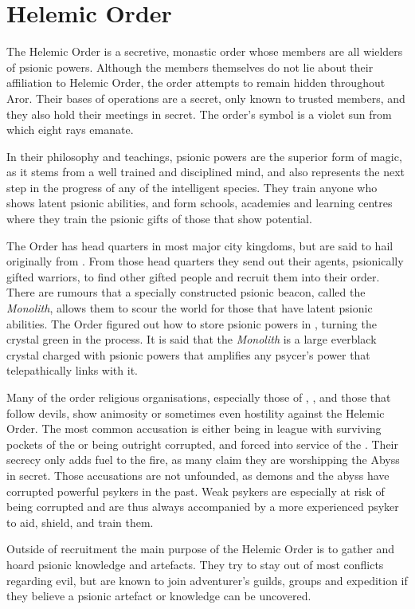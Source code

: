 \section{Helemic Order}
\label{sec:Helemic Order}

The Helemic Order is a secretive, monastic order whose members are all
wielders of psionic powers. Although the members themselves do not lie about
their affiliation to Helemic Order, the order attempts to remain hidden
throughout Aror. Their bases of operations are a secret, only known to trusted
members, and they also hold their meetings in secret. The order's symbol is a
violet sun from which eight rays emanate.

In their philosophy and teachings, psionic powers are the superior form of
magic, as it stems from a well trained and disciplined mind, and also
represents the next step in the progress of any of the intelligent
species. They train anyone who shows latent psionic abilities, and form
schools, academies and learning centres where they train the psionic gifts of
those that show potential.

The Order has head quarters in most major city kingdoms, but are said to hail
originally from . From those head quarters they
send out their agents, psionically gifted warriors, to find other gifted
people and recruit them into their order. There are rumours that a specially
constructed psionic beacon, called the \emph{Monolith}, allows them to scour
the world for those that have latent psionic abilities. The Order figured out
how to store psionic powers in , turning the crystal
green in the process. It is said that the \emph{Monolith} is a large everblack
crystal charged with psionic powers that amplifies any psycer's power that
telepathically links with it.

Many of the order religious organisations, especially those of
, , and those that follow devils, show
animosity or sometimes even hostility against the Helemic Order. The most
common accusation is either being in league with surviving pockets of the
 or being outright corrupted, and forced into service of
the . Their secrecy only adds fuel to the fire, as many
claim they are worshipping the Abyss in secret. Those accusations are not
unfounded, as demons and the abyss have corrupted powerful psykers in the
past. Weak psykers are especially at risk of being corrupted and are thus
always accompanied by a more experienced psyker to aid, shield, and train
them.

Outside of recruitment the main purpose of the Helemic Order is to gather and
hoard psionic knowledge and artefacts. They try to stay out of most conflicts
regarding evil, but are known to join adventurer's guilds, groups and
expedition if they believe a psionic artefact or knowledge can be uncovered.
